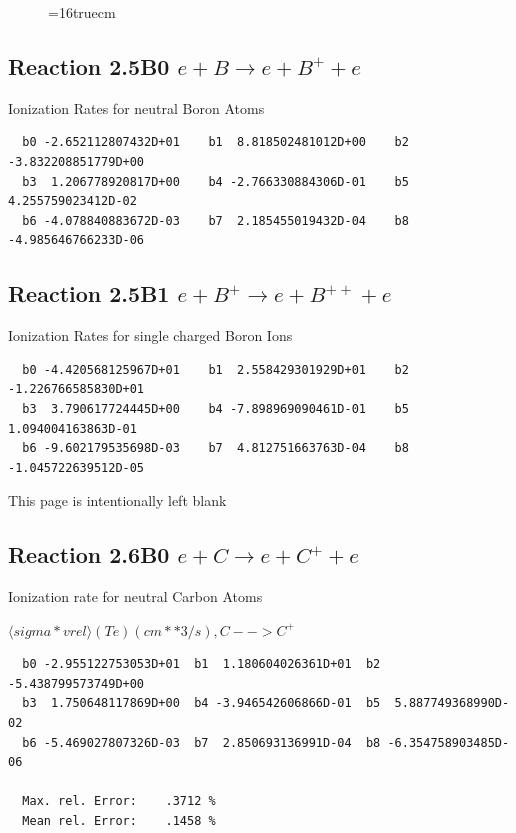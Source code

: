 \documentclass[12pt,dvips]{article}
\begin{document}
\begin{figure} \label{2.4B}
\epsfxsize=16truecm
\end{figure}
\newpage

\subsection{
Reaction 2.5B0   $e + B \rightarrow e + B^+ + e $
}

 Ionization Rates for neutral Boron Atoms


\begin{small}\begin{verbatim}
  b0 -2.652112807432D+01    b1  8.818502481012D+00    b2 -3.832208851779D+00
  b3  1.206778920817D+00    b4 -2.766330884306D-01    b5  4.255759023412D-02
  b6 -4.078840883672D-03    b7  2.185455019432D-04    b8 -4.985646766233D-06
\end{verbatim}\end{small}

\subsection{
Reaction 2.5B1   $e + B^+ \rightarrow e + B^{++} + e $
}

 Ionization Rates for single charged Boron Ions


\begin{small}\begin{verbatim}
  b0 -4.420568125967D+01    b1  2.558429301929D+01    b2 -1.226766585830D+01
  b3  3.790617724445D+00    b4 -7.898969090461D-01    b5  1.094004163863D-01
  b6 -9.602179535698D-03    b7  4.812751663763D-04    b8 -1.045722639512D-05
\end{verbatim}\end{small}

\newpage
This page is intentionally left blank
\newpage

\subsection{
Reaction 2.6B0   $e + C \rightarrow e + C^+ + e  $
}

  Ionization rate for neutral Carbon Atoms

  $ \langle sigma*vrel \rangle(Te)  (cm**3/s), C --> C^+$

\begin{small}\begin{verbatim}
  b0 -2.955122753053D+01  b1  1.180604026361D+01  b2 -5.438799573749D+00
  b3  1.750648117869D+00  b4 -3.946542606866D-01  b5  5.887749368990D-02
  b6 -5.469027807326D-03  b7  2.850693136991D-04  b8 -6.354758903485D-06

  Max. rel. Error:    .3712 %
  Mean rel. Error:    .1458 %





\end{verbatim}\end{small}
\end{document}
